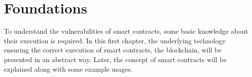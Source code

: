 \section{Foundations}

To understand the vulnerabilities of smart contracts, some basic knowledge about their execution is required. In this first chapter, the underlying technology ensuring the correct execution of smart contracts, the blockchain, will be presented in an abstract way. Later, the concept of smart contracts will be explained along with some example usages.




\pagebreak{}